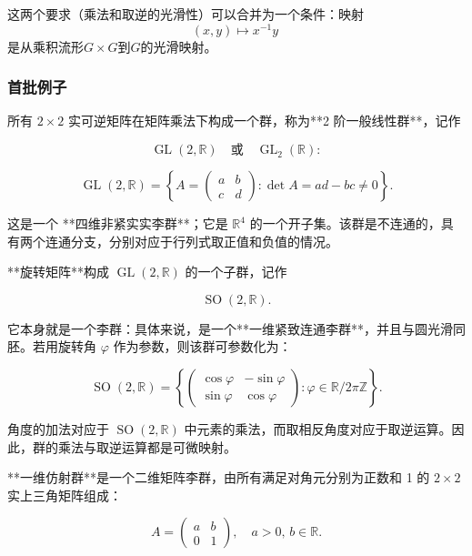 这两个要求（乘法和取逆的光滑性）可以合并为一个条件：映射
$$
(x,y) \mapsto x^{-1}y~
$$
是从乘积流形$G \times G$到$G$的光滑映射。
\subsubsection{首批例子}

所有 $2 \times 2$ 实可逆矩阵在矩阵乘法下构成一个群，称为**2 阶一般线性群**，记作

$$
\operatorname{GL}(2,\mathbb{R}) \quad \text{或} \quad \operatorname{GL}_{2}(\mathbb{R}) :
$$

$$
\operatorname{GL}(2,\mathbb{R})=\left\{A=\begin{pmatrix}a & b \\ c & d\end{pmatrix} : \det A = ad - bc \neq 0 \right\}.
$$

这是一个 **四维非紧实实李群**；它是 $\mathbb{R}^4$ 的一个开子集。该群是不连通的，具有两个连通分支，分别对应于行列式取正值和负值的情况。

**旋转矩阵**构成 $\operatorname{GL}(2,\mathbb{R})$ 的一个子群，记作

$$
\operatorname{SO}(2,\mathbb{R}).
$$

它本身就是一个李群：具体来说，是一个**一维紧致连通李群**，并且与圆光滑同胚。若用旋转角 $\varphi$ 作为参数，则该群可参数化为：

$$
\operatorname{SO}(2,\mathbb{R})=\left\{\begin{pmatrix}\cos \varphi & -\sin \varphi \\ \sin \varphi & \cos \varphi \end{pmatrix} : \varphi \in \mathbb{R} / 2\pi\mathbb{Z}\right\}.
$$

角度的加法对应于 $\operatorname{SO}(2,\mathbb{R})$ 中元素的乘法，而取相反角度对应于取逆运算。因此，群的乘法与取逆运算都是可微映射。

**一维仿射群**是一个二维矩阵李群，由所有满足对角元分别为正数和 1 的 $2 \times 2$ 实上三角矩阵组成：

$$
A=\begin{pmatrix} a & b \\ 0 & 1 \end{pmatrix}, \quad a > 0, \, b \in \mathbb{R}.
$$
